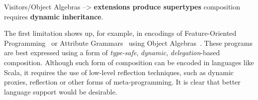 Visitors/Object Algebras --> {\bf extensions produce supertypes}
composition requires {\bf dynamic inheritance}. 


\begin{comment}
There has been a remarkable number of works aimed at improving support
for extensibility in programming languages. The motivation behind this
line of work is simple, and it is captured quite elegantly by the
infamous \emph{Expression Problem~}\cite{wadler1998expression}: there
are \emph{two} common and desirable forms of extensibility, but most
mainstream languages can only support one form well. Unfortunately
the lack of support in the other form has significant
consequences in terms of code maintenance and software evolution.  As a
result researchers proposed various approaches to address the problem,
including: visions of new programming
models~\cite{Prehofer97,Tarr99ndegrees,Harrison93subject}; new
programming languages or language
extensions~\cite{McDirmid01Jiazzi,Aracic06CaesarJ,Smaragdakis98mixin,nystrom2006j},
and \emph{design patterns} that can be used with existing mainstream
languages~\cite{togersen:2004,Zenger-Odersky2005,oliveira09modular,oliveira2012extensibility}.

Some of the more recent work on extensibility is focused on design
patterns. Examples include \emph{Object
  Algebras}~\cite{oliveira2012extensibility}, \emph{Modular Visitors}~\cite{oliveira09modular,togersen:2004} or
Torgersen's~\cite{togersen:2004} four design patterns using generics. In those
approaches the idea is to use some advanced (but already available)
features, such as \emph{generics}~\cite{Bracha98making}, in combination with conventional
OOP features to model more extensible designs.  Those designs work in
modern OOP languages such as Java, C\#, or Scala.

Although such design patterns give practical benefits in terms of
extensibility, they also expose limitations in existing mainstream OOP
languages. In particular there are three pressing limitations: 
1) lack of good mechanisms for
  \emph{object-level} composition; 2) \emph{conflation of 
    (type) inheritance with subtyping}; 3) \emph{heavy reliance on generics}.
\end{comment}


The first limitation shows up, for example, in encodings of Feature-Oriented
Programming~\cite{Prehofer97} or Attribute Grammars~\cite{Knuth1968} using Object
Algebras~\cite{oliveira2013feature,rendel14attributes}. These programs are best
expressed using a form of \emph{type-safe}, \emph{dynamic},
\emph{delegation}-based composition. Although such form of
composition can be encoded in languages like Scala, it requires the
use of low-level reflection techniques, such as dynamic proxies,
reflection or other forms of meta-programming. It is clear
that better language support would be desirable.

